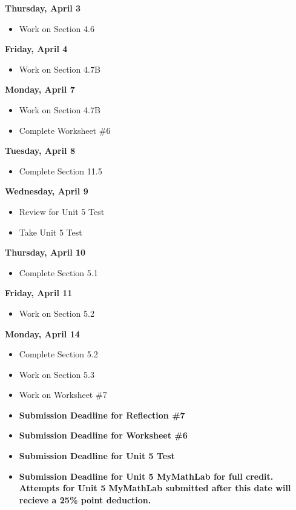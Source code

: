 \documentclass[11pt]{article}
\begin{document}
\textbf{Thursday, April 3}

\begin{itemize}
\item Work on Section 4.6
\end{itemize}

\textbf{Friday, April 4}

\begin{itemize}
\item Work on Section 4.7B
\end{itemize}

\textbf{Monday, April 7}

\begin{itemize}
\item Work on Section 4.7B
\item Complete Worksheet \#6
\end{itemize}

\textbf{Tuesday, April 8}

\begin{itemize}
\item Complete Section 11.5
\end{itemize}

\textbf{Wednesday, April 9}

\begin{itemize}
\item Review for Unit 5 Test
\item Take Unit 5 Test
\end{itemize}

\textbf{Thursday, April 10}

\begin{itemize}
\item Complete Section 5.1
\end{itemize}

\textbf{Friday, April 11}

\begin{itemize}
\item Work on Section 5.2
\end{itemize}

\textbf{Monday, April 14}

\begin{itemize}
\item Complete Section 5.2
\item Work on Section 5.3
\item Work on Worksheet \#7
\item \textbf{Submission Deadline for Reflection \#7}
\item \textbf{Submission Deadline for Worksheet \#6}
\item \textbf{Submission Deadline for Unit 5 Test}
\item \textbf{Submission Deadline for Unit 5 MyMathLab for full credit. Attempts for Unit 5 MyMathLab submitted after this date will recieve a 25\% point deduction.}
\end{itemize}
\end{document}
